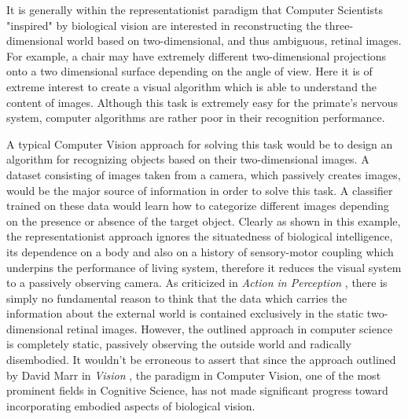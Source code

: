 It is generally within the representationist paradigm that Computer
Scientists "inspired" by biological vision are interested in reconstructing
the three-dimensional world based on two-dimensional, and thus ambiguous,
retinal images. For example, a chair may have extremely different
two-dimensional projections onto a two dimensional surface depending on the
angle of view. Here it is of extreme interest to create a visual algorithm
which is able to understand the content of images. Although this task is
extremely easy for the primate's nervous system, computer algorithms are
rather poor in their recognition performance. 

A typical Computer Vision approach for solving this task would be to design
an algorithm for recognizing objects based on their two-dimensional images.
A dataset consisting of images taken from a camera, which passively creates
images, would be the major source of information in order to solve this
task. A classifier trained on these data would learn how to categorize
different images depending on the presence or absence of the target object.
Clearly as shown in this example, the representationist approach ignores
the situatedness of biological intelligence, its dependence on a body and
also on a history of sensory-motor coupling which underpins the performance
of living system, therefore it reduces the visual system to a passively
observing camera. As criticized in \textit{Action in Perception}
\citep{noe2004a}, there is simply no fundamental reason to think that the
data which carries the information about the external world is contained
exclusively in the static two-dimensional retinal images. However, the
outlined approach in computer science is completely static, passively
observing the outside world and radically disembodied. It wouldn't be
erroneous to assert that since the approach outlined by David Marr in
\textit{Vision} \citep{marr1982a}, the paradigm in Computer Vision, one of
the most prominent fields in Cognitive Science, has not made significant
progress toward incorporating embodied aspects of biological vision. 


